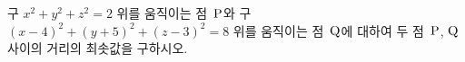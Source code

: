 구 $x^2+y^2+z^2=2$ 위를 움직이는 점~$\mathrm{P}$와 구 $(x-4)^2+(y+5)^2+(z-3)^2=8$ 위를 움직이는 점~$\mathrm{Q}$에 대하여 두 점~$\mathrm{P}$, $\mathrm{Q}$ 사이의 거리의 최솟값을 구하시오.
